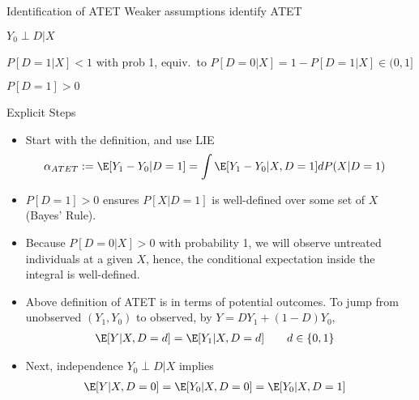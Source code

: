 \documentclass[aspectratio=169, handout]{beamer}
\begin{document}
{\scriptsize
\begin{frame}{Identification of ATET}
Weaker assumptions identify ATET
\vspace{-10pt}
\begin{enumerate}
  {\footnotesize
  \item $Y_0\perp D|X$
  \item $P[D=1|X]< 1$ with prob 1,
    equiv.\ to $P[D=0|X]=1-P[D=1|X]\in (0,1]$
  \item $P[D=1]>0$
  }
\end{enumerate}
\vspace{-7pt}
\pause
Explicit Steps
\begin{itemize}
\vspace{-7pt}
  \item Start with the definition, and use LIE
    \begin{align*}
      \alpha_{ATET}
      &:=
      \E[Y_1-Y_0|D=1]
      =
      \int
      \E[Y_1-Y_0|X,D=1]
      dP(X|D=1)
    \end{align*}

  \pause
  \item
    $P[D=1]>0$ ensures $P[X|D=1]$ is well-defined over some set of $X$
    (Bayes' Rule).



  \pause
  \item
    Because $P[D=0|X]>0$ with probability 1,
    we will observe \alert{untreated} individuals at a given $X$, hence,
    the conditional expectation inside the integral is well-defined.

  \pause
  \item Above definition of ATET is in terms of potential outcomes.
    To jump from \alert{unobserved} $(Y_1,Y_0)$ to \alert{observed},
    by $Y = DY_1 + (1-D)Y_0$,
    \begin{align*}
      \E[Y|X,D=d]
      &=
      \E[Y_1|X,D=d]
      \qquad
      d\in\{0,1\}
    \end{align*}

  \pause
  \item Next, independence $Y_0\perp D|X$ implies
    \begin{align*}
      \E[Y|X,D=0]
      &=
      \E[Y_0|X,D=0]
      =
      \E[Y_0|X,D=1]
    \end{align*}

\end{itemize}
\end{frame}
}
\end{document}
